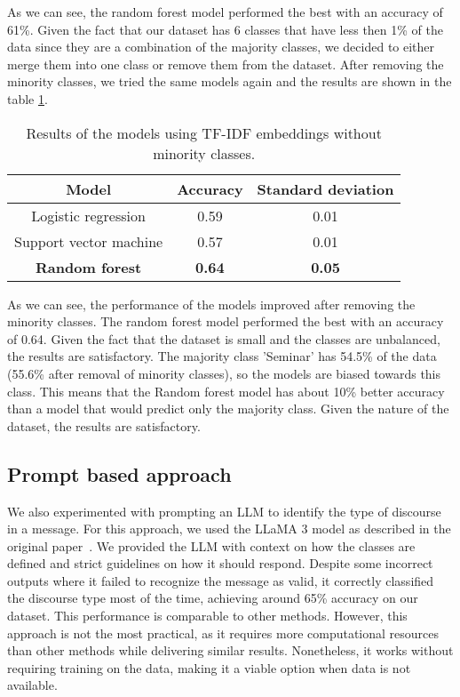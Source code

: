 \documentclass[fleqn,moreauthors,10pt]{ds_report}
\begin{document}
As we can see, the random forest model performed the best with an accuracy of 61\%. 
Given the fact that our dataset has 6 classes that have less then 1\% of the data since they are a combination of the majority classes, we decided to either merge them into one class or remove them from the dataset.
After removing the minority classes, we tried the same models again and the results are shown in the table \ref{tab:tfidf_results_no_compound}.

\begin{table}[h]
    \centering
    \begin{tabular}{|c|c|c|}
    \hline
    \textbf{Model} & \textbf{Accuracy} & \textbf{Standard deviation} \\ \hline
    Logistic regression & 0.59 & 0.01 \\ \hline
    Support vector machine & 0.57 & 0.01 \\ \hline
    \textbf{Random forest} & \textbf{0.64} & \textbf{0.05} \\ \hline
    \end{tabular}

    \caption{Results of the models using TF-IDF embeddings without minority classes.}
    \label{tab:tfidf_results_no_compound}
\end{table}

As we can see, the performance of the models improved after removing the minority classes. The random forest model performed the best with an accuracy of 0.64.
Given the fact that the dataset is small and the classes are unbalanced, the results are satisfactory. The majority class 'Seminar' has 54.5\% of the data (55.6\% after removal of minority classes), so the models are biased towards this class.
This means that the Random forest model has about 10\% better accuracy than a model that would predict only the majority class. Given the nature of the dataset, the results are satisfactory.

\subsection{Prompt based approach}
We also experimented with prompting an LLM to identify the type of discourse in a message. For this approach, we used the LLaMA 3 model as described in the original paper~\cite{llama}. We provided the LLM with context on how the classes are defined and strict guidelines on how it should respond. Despite some incorrect outputs where it failed to recognize the message as valid, it correctly classified the discourse type most of the time, achieving around 65\% accuracy on our dataset. This performance is comparable to other methods. However, this approach is not the most practical, as it requires more computational resources than other methods while delivering similar results. Nonetheless, it works without requiring training on the data, making it a viable option when data is not available.
\end{document}
